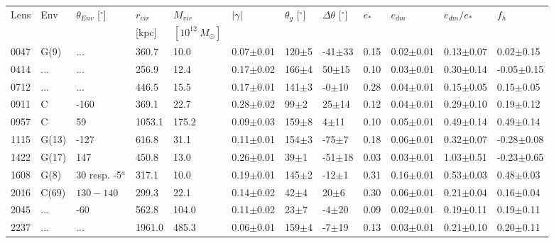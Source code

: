 \documentclass[useAMS,usenatbib]{mn2e}
\begin{document}
\begin{table}
\begin{center}
\begin{tabular}{l l l l l l l l l l l l}
      \multirow{2}{*}{Lens} & \multirow{2}{*}{Env} & \multirow{2}{*}{$\theta_{Env}$ [$^{\circ}$]} & $r_{vir}$ & $M_{vir}$ & \multirow{2}{*}{$|\gamma|$} & \multirow{2}{*}{$\theta_{g}$ [$^{\circ}$]} & \multirow{2}{*}{$\Delta\theta$ [$^{\circ}$]} & \multirow{2}{*}{$e_{*}$} & \multirow{2}{*}{$e_{dm}$} & \multirow{2}{*}{$e_{dm}/e_{*}$} & \multirow{2}{*}{$f_h$} \\
       & & & [kpc] & $[10^{12} \ M_{\odot}]$ & & & & & & & \\ \hline
      0047 & G(9) & ... & 360.7 & 10.0 & 0.07$\pm$0.01 & 120$\pm$5 & -41$\pm$33 & 0.15 & 0.02$\pm$0.01 & 0.13$\pm$0.07 & 0.02$\pm$0.15 \\
      0414 & ... & ... & 256.9 & 12.4 & 0.17$\pm$0.02 & 166$\pm$4 & 50$\pm$15 & 0.10 & 0.03$\pm$0.01 & 0.30$\pm$0.14 & -0.05$\pm$0.15 \\
      0712 & ... & ... & 446.5 & 15.5 & 0.17$\pm$0.01 & 141$\pm$3 & -0$\pm$10 & 0.28 & 0.04$\pm$0.01 & 0.15$\pm$0.05 & 0.15$\pm$0.05 \\
      0911 & C & -160 & 369.1 & 22.7 & 0.28$\pm$0.02 & 99$\pm$2 & 25$\pm$14 & 0.12 & 0.04$\pm$0.01 & 0.29$\pm$0.10 & 0.19$\pm$0.12 \\
      0957 & C & 59 & 1053.1 & 175.2 & 0.09$\pm$0.03 & 159$\pm$8 & 4$\pm$11 & 0.10 & 0.05$\pm$0.01 & 0.49$\pm$0.14 & 0.49$\pm$0.14 \\
      1115 & G(13) & -127 & 616.8 & 31.1 & 0.11$\pm$0.01 & 154$\pm$3 & -75$\pm$7 & 0.18 & 0.06$\pm$0.01 & 0.32$\pm$0.07 & -0.28$\pm$0.08 \\
      1422 & G(17) & 147 & 450.8 & 13.0 & 0.26$\pm$0.01 & 39$\pm$1 & -51$\pm$18 & 0.03 & 0.03$\pm$0.01 & 1.03$\pm$0.51 & -0.23$\pm$0.65 \\
      1608 & G(8) & 30 resp. -5$^{a}$ & 317.1 & 10.0 & 0.19$\pm$0.01 & 145$\pm$2 & -12$\pm$1 & 0.31 & 0.16$\pm$0.01 & 0.53$\pm$0.03 & 0.48$\pm$0.03 \\
      2016 & C(69) & $130-140$ & 299.3 & 22.1 & 0.14$\pm$0.02 & 42$\pm$4 & 20$\pm$6 & 0.30 & 0.06$\pm$0.01 & 0.21$\pm$0.04 & 0.16$\pm$0.04 \\
      2045 & ... & -60 & 562.8 & 104.0 & 0.11$\pm$0.02 & 23$\pm$7 & -4$\pm$20 & 0.09 & 0.02$\pm$0.01 & 0.19$\pm$0.11 & 0.19$\pm$0.11 \\
      2237 & ... & ... & 1961.0 & 485.3 & 0.06$\pm$0.01 & 159$\pm$4 & -7$\pm$19 & 0.13 & 0.03$\pm$0.01 & 0.21$\pm$0.10 & 0.20$\pm$0.11 \\
    \end{tabular}

\end{center}
\end{table}
\end{document}
